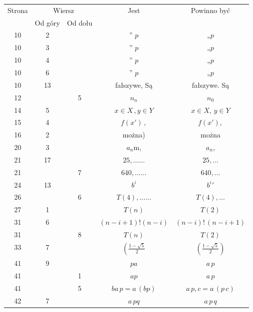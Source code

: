 \documentclass[a4paper,11pt]{article}
\begin{document}
\newpage


\vspace{\spaceFive}


\begin{center}

  \begin{tabular}{|c|c|c|c|c|}
    \hline
    Strona & \multicolumn{2}{c|}{Wiersz} & Jest
                              & Powinno być \\ \cline{2-3}
    & Od góry & Od dołu & & \\
    \hline
    10  &  2 & & ” $p$ & „$p$ \\
    10  &  3 & & ” $p$ & „$p$ \\
    10  &  4 & & ” $p$ & „$p$ \\
    10  &  6 & & ” $p$ & „$p$ \\
    10  & 13 & & fałszywe, Są & fałszywe. Są \\
    12  & &  5 & $n_{ n }$ & $n_{ 0 }$ \\
    14  &  5 & & $x \in X \, , y \in Y$ & $x \in X, \, y \in Y$ \\
    15  &  4 & & $f( x' ) \, ,$ & $f( x' ),$ \\
    16  &  2 & & można) & można \\
    20  &  3 & & $a_{ n }$m, & $a_{ n }$, \\
    21  & 17 & & $25, \ldots \ldots$ & $25, \ldots$ \\
    21  & &  7 & $640, \ldots \ldots$ & $640, \ldots$ \\
    24  & 13 & & $b^{ i }$ & $b^{ i }{}'$ \\
    26  & &  6 & $T( 4 ), \ldots \ldots$ & $T( 4 ), \ldots$ \\
    27  &  1 & & $T( n )$ & $T( 2 )$ \\
    31  &  6 & & $( n - i + 1 )! ( n - i )$
    & $( n - i )! \, ( n - i + 1 )$ \\
    31  & &  8 & $T( n )$ & $T( 2 )$ \\
    33  &  7 & & $\left( \frac{ 1 - \sqrt{ 5 } }{ 2 } \right.$
    & $\left( \frac{ 1 - \sqrt{ 5 } }{ 2 } \right)$ \\
    41  &  9 & & $p a$ & $a \, p$ \\
    41  & &  1 & $a p$ & $a \, p$ \\
    41  & &  5 & $ba \, p = a \, ( b p )$ & $a \, p , c = a \, ( p \, c )$ \\
    42  &  7 & & $a \, p q$ & $a \, p \, q$ \\

\end{tabular}
\end{center}
\end{document}
